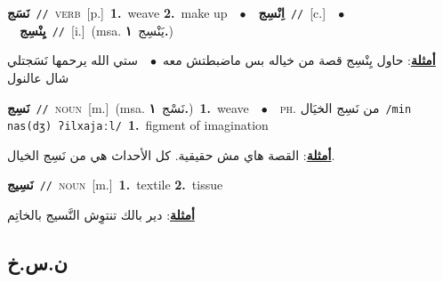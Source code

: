 \documentclass[10pt,a4paper,twoside]{article} %
\begin{document}
\begin{multicols}{2}
{\setlength\topsep{0pt}\textbf{\foreignlanguage{arabic}{نَسَج}}\ {\color{gray}\texttt{//}\color{black}}\ \textsc{verb}\ [p.]\ \textbf{1.}~weave  \textbf{2.}~make up\ \ $\bullet$\ \ \setlength\topsep{0pt}\textbf{\foreignlanguage{arabic}{اِنْسِج}}\ {\color{gray}\texttt{//}\color{black}}\ [c.]\ \ $\bullet$\ \ \setlength\topsep{0pt}\textbf{\foreignlanguage{arabic}{يِنْسِج}}\ {\color{gray}\texttt{//}\color{black}}\ [i.]\ \color{gray}(msa. \foreignlanguage{arabic}{يَنْسِج}~\foreignlanguage{arabic}{\textbf{١.}})\color{black}\  \begin{flushright}\color{gray}\foreignlanguage{arabic}{\textbf{\underline{\foreignlanguage{arabic}{أمثلة}}}: حاول يِنْسِج قصة من خياله بس ماضبطتش معه\ $\bullet$\ \  ستي الله يرحمها نَسَجتلي شال عالنول}\end{flushright}\color{black}} \vspace{2mm}

{\setlength\topsep{0pt}\textbf{\foreignlanguage{arabic}{نَسِج}}\ {\color{gray}\texttt{//}\color{black}}\ \textsc{noun}\ [m.]\ \color{gray}(msa. \foreignlanguage{arabic}{نَسْج}~\foreignlanguage{arabic}{\textbf{١.}})\color{black}\ \textbf{1.}~weave\ \ $\bullet$\ \ \textsc{ph.} \color{gray} \foreignlanguage{arabic}{من نَسِج الخيَال}\color{black}\ {\color{gray}\texttt{/{\sffamily min nas(dʒ) ʔilxajaːl}/}\color{black}}\ \textbf{1.}~figment of imagination\  \begin{flushright}\color{gray}\foreignlanguage{arabic}{\textbf{\underline{\foreignlanguage{arabic}{أمثلة}}}: القصة هاي مش حقيقية. كل الأحداث هي من نَسِج الخيال.}\end{flushright}\color{black}} \vspace{2mm}

{\setlength\topsep{0pt}\textbf{\foreignlanguage{arabic}{نَسِيج}}\ {\color{gray}\texttt{//}\color{black}}\ \textsc{noun}\ [m.]\ \textbf{1.}~textile  \textbf{2.}~tissue\  \begin{flushright}\color{gray}\foreignlanguage{arabic}{\textbf{\underline{\foreignlanguage{arabic}{أمثلة}}}: دير بالك تنتوِش النَّسيج بالخاتِم}\end{flushright}\color{black}} \vspace{2mm}

\vspace{-3mm}
\subsection*{\color{blue}\foreignlanguage{arabic}{ن.س.خ}\color{blue}{}} 


\end{multicols}
\end{document}
